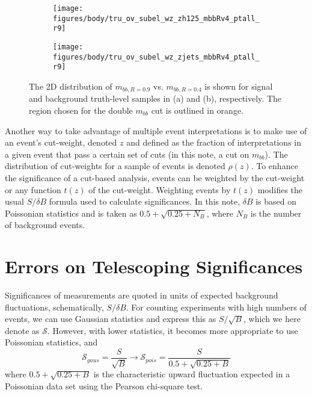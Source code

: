 \begin{figure}[!htbp]\captionsetup{justification=centering}
\begin{center}
\begin{subfigure}[t]{18pc}\centering\texttt{[image: figures/body/tru\_ov\_subel\_wz\_zh125\_mbbRv4\_ptall\_r9]}\caption{}\end{subfigure}
\begin{subfigure}[t]{18pc}\centering\texttt{[image: figures/body/tru\_ov\_subel\_wz\_zjets\_mbbRv4\_ptall\_r9]}\caption{}\end{subfigure}
\caption{\label{fig:2mwtru}The 2D distribution of $m_{bb,R=0.9}$ vs. $m_{bb,R=0.4}$ is shown for signal and background truth-level samples in (a) and (b), respectively.  The region chosen for the double $m_{bb}$ cut is outlined in orange.}
\end{center}
\end{figure}

Another way to take advantage of multiple event interpretations is to make use of an event's cut-weight, denoted $z$ and defined as the fraction of interpretations in a given event that pass a certain set of cuts (in this note, a cut on $m_{bb}$).  The distribution of cut-weights for a sample of events is denoted $\rho\left(z\right)$.  To enhance the significance of a cut-based analysis, events can be weighted by the cut-weight or any function $t\left(z\right)$ of the cut-weight.  Weighting events by $t\left(z\right)$ modifies the usual $S/\delta B$ formula used to calculate significances.  In this note, $\delta B$ is based on Poissonian statistics and is taken as $0.5+\sqrt{0.25+N_B}$, where $N_B$ is the number of background events.


\section{Errors on Telescoping Significances}
\label{sec:telerr}
Significances of measurements are quoted in units of expected background fluctuations, schematically, $S/\delta B$.  For counting experiments with high numbers of events, we can use Gaussian statistics and express this as $S/\sqrt{B}$, which we here denote as $\mathscr{S}$.  However, with lower statistics, it becomes more appropriate to use Poissonian statistics, and
\begin{equation}
\mathscr{S}_{gaus}=\frac{S}{\sqrt{B}}\to\mathscr{S}_{pois}=\frac{S}{0.5+\sqrt{0.25+B}}
\end{equation}
where $0.5+\sqrt{0.25+B}$ is the characteristic upward fluctuation expected in a Poissonian data set using the Pearson chi-square test\cite{roofit}.

